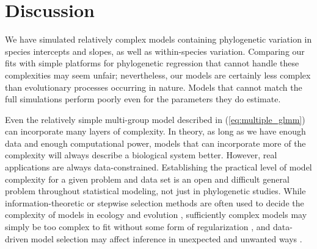 \documentclass[12pt]{article}
\begin{document}

\section*{Discussion}

We have simulated relatively complex models containing phylogenetic variation in species intercepts and slopes, as well as within-species variation.
Comparing our fits with simple platforms for phylogenetic regression that cannot handle these complexities may seem unfair; nevertheless, our models are certainly less complex than evolutionary processes occurring in nature.
Models that cannot match the full simulations perform poorly even for the parameters they do estimate.

Even the relatively simple multi-group model described in (\ref{eq:multiple_glmm}) can incorporate many layers of complexity.
In theory, as long as we have enough data and enough computational power, models that can incorporate more of the complexity will always describe a biological system better.
However, real applications are always data-constrained.
Establishing the practical level of model complexity for a given problem and data set is an open and difficult general problem throughout statistical modeling,
not just in phylogenetic studies.
While information-theoretic or stepwise selection methods are often used to decide the complexity of models in ecology and evolution \cite{matuschek2017balancing,darriba2020modeltest}, sufficiently complex models may simply be too complex to fit without some form of regularization
\cite{uriarte2009preaching}, and data-driven model selection may affect inference in unexpected and unwanted ways \cite{hurvich1990impact,morin2020is}.

\end{document}
